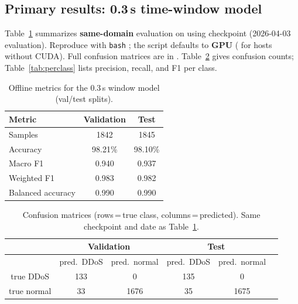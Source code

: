 \subsection{\texorpdfstring{Primary results: 0.3\,s time-window model}{Primary results: 0.3 s time-window model}}
Table~\ref{tab:metrics} summarizes \textbf{same-domain} evaluation on
 using checkpoint
(2026-04-03 evaluation). Reproduce with \texttt{bash} ;
the script defaults to \textbf{GPU} ( for hosts without CUDA).
Full confusion matrices are in .
Table~\ref{tab:confmat} gives confusion counts; Table~\ref{tab:perclass} lists
precision, recall, and F1 per class.

\begin{table}[ht]
\centering
\caption[Offline metrics (0.3\,s window)]{Offline metrics for the 0.3\,s window model (val/test splits).}
\begin{tabular}{|l|c|c|}
\hline
\textbf{Metric} & \textbf{Validation} & \textbf{Test} \\
\hline
Samples & 1842 & 1845 \\
\hline
Accuracy & 98.21\% & 98.10\% \\
\hline
Macro F1 & 0.940 & 0.937 \\
\hline
Weighted F1 & 0.983 & 0.982 \\
\hline
Balanced accuracy & 0.990 & 0.990 \\
\hline
\end{tabular}
\label{tab:metrics}
\end{table}

\begin{table}[ht]
\centering
\caption[Confusion matrices (val and test)]{Confusion matrices (rows\,=\,true class, columns\,=\,predicted). Same checkpoint and date as Table~\ref{tab:metrics}.}
\begin{tabular}{|c|c|c|c|c|c|}
\hline
 & \multicolumn{2}{c|}{\textbf{Validation}} & \multicolumn{2}{c|}{\textbf{Test}} & \\
\hline
 & pred.\ DDoS & pred.\ normal & pred.\ DDoS & pred.\ normal & \\
\hline
true DDoS & 133 & 0 & 135 & 0 & \\
\hline
true normal & 33 & 1676 & 35 & 1675 & \\
\hline
\end{tabular}
\label{tab:confmat}
\end{table}


